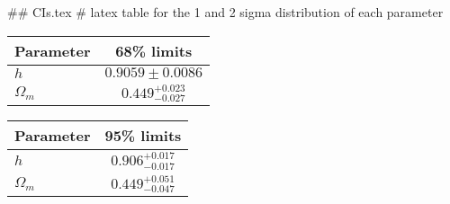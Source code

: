 ## CIs.tex
# latex table for the 1 and 2 sigma distribution of each parameter

\begin{tabular} { l  c}
 Parameter &  68\% limits\\
\hline
{\boldmath$h              $} & $0.9059\pm 0.0086          $\\
{\boldmath$\Omega_m       $} & $0.449^{+0.023}_{-0.027}   $\\
\hline
\end{tabular}

\begin{tabular} { l  c}
 Parameter &  95\% limits\\
\hline
{\boldmath$h              $} & $0.906^{+0.017}_{-0.017}   $\\
{\boldmath$\Omega_m       $} & $0.449^{+0.051}_{-0.047}   $\\
\hline
\end{tabular}
